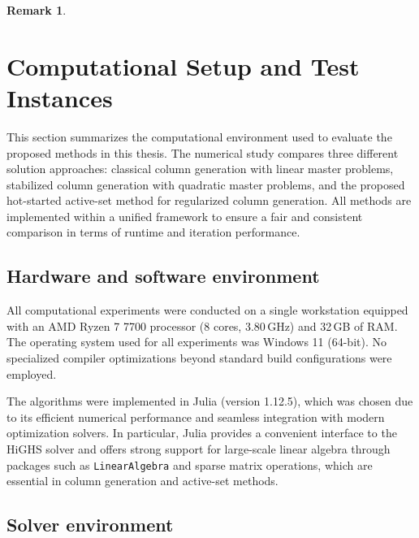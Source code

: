 \documentclass{book}
\theoremstyle{definition}
\newtheorem{remark}[theorem]{Remark}
\newcounter{algorithm_}
\numberwithin{algorithm_}{chapter}
\begin{document}
{\begin{remark}
\end{remark}

\newpage












\section{Computational Setup and Test Instances}

This section summarizes the computational environment used to evaluate the proposed methods in this thesis. The numerical study compares three different solution approaches: classical column generation with linear master problems, stabilized column generation with quadratic master problems, and the proposed hot-started active-set method for regularized column generation. All methods are implemented within a unified framework to ensure a fair and consistent comparison in terms of runtime and iteration performance.

\subsection{Hardware and software environment}

All computational experiments were conducted on a single workstation equipped with an AMD Ryzen 7 7700 processor (8 cores, 3.80\,GHz) and 32\,GB of RAM. The operating system used for all experiments was Windows 11 (64-bit). No specialized compiler optimizations beyond standard build configurations were employed.

The algorithms were implemented in Julia (version 1.12.5), which was chosen due to its efficient numerical performance and seamless integration with modern optimization solvers. In particular, Julia provides a convenient interface to the HiGHS solver and offers strong support for large-scale linear algebra through packages such as \texttt{LinearAlgebra} and sparse matrix operations, which are essential in column generation and active-set methods.

\subsection{Solver environment}

}
\end{document}

